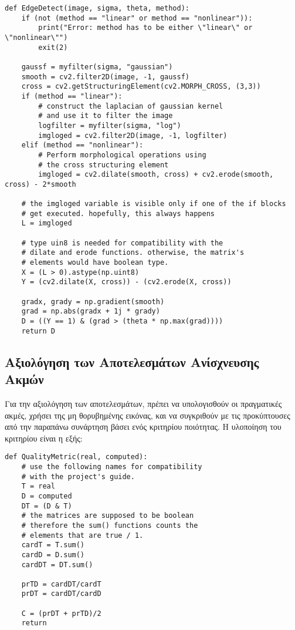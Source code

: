 \documentclass{article}
\begin{document}
\begin{lstlisting}[breaklines=true, showstringspaces=false]
def EdgeDetect(image, sigma, theta, method):
    if (not (method == "linear" or method == "nonlinear")):
        print("Error: method has to be either \"linear\" or \"nonlinear\"")
        exit(2)
    
    gaussf = myfilter(sigma, "gaussian")
    smooth = cv2.filter2D(image, -1, gaussf)
    cross = cv2.getStructuringElement(cv2.MORPH_CROSS, (3,3))
    if (method == "linear"):
        # construct the laplacian of gaussian kernel
        # and use it to filter the image
        logfilter = myfilter(sigma, "log")
        imgloged = cv2.filter2D(image, -1, logfilter)
    elif (method == "nonlinear"):
        # Perform morphological operations using
        # the cross structuring element
        imgloged = cv2.dilate(smooth, cross) + cv2.erode(smooth, cross) - 2*smooth
    
    # the imgloged variable is visible only if one of the if blocks
    # get executed. hopefully, this always happens
    L = imgloged
    
    # type uin8 is needed for compatibility with the
    # dilate and erode functions. otherwise, the matrix's
    # elements would have boolean type.
    X = (L > 0).astype(np.uint8)
    Y = (cv2.dilate(X, cross)) - (cv2.erode(X, cross))

    gradx, grady = np.gradient(smooth)
    grad = np.abs(gradx + 1j * grady)
    D = ((Y == 1) & (grad > (theta * np.max(grad))))
    return D
\end{lstlisting}

\subsection{Αξιολόγηση των Αποτελεσμάτων Ανίσχνευσης Ακμών}

Για την αξιολόγηση των αποτελεσμάτων, πρέπει να υπολογισθούν οι πραγματικές ακμές, χρήσει της μη θορυβημένης εικόνας, και να συγκριθούν με τις προκύπτουσες από την παραπάνω συνάρτηση βάσει ενός κριτηρίου ποιότητας. Η υλοποίηση του κριτηρίου είναι η εξής:

\begin{lstlisting}[breaklines=true, showstringspaces=false]
def QualityMetric(real, computed):
    # use the following names for compatibility
    # with the project's guide.
    T = real
    D = computed
    DT = (D & T)
    # the matrices are supposed to be boolean
    # therefore the sum() functions counts the
    # elements that are true / 1.
    cardT = T.sum()
    cardD = D.sum()
    cardDT = DT.sum()

    prTD = cardDT/cardT
    prDT = cardDT/cardD

    C = (prDT + prTD)/2
    return 
\end{lstlisting}
\end{document}
